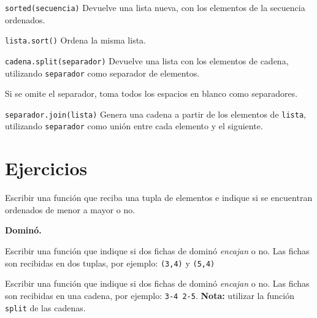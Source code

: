 \begin{referencia_python}
\begin{sintaxis}{\lstinline!sorted(secuencia)!}
Devuelve una lista nueva, con los elementos de la secuencia ordenados.
\end{sintaxis}

\begin{sintaxis}{\lstinline!lista.sort()!}
Ordena la misma lista.
\end{sintaxis}

\begin{sintaxis}{\lstinline!cadena.split(separador)!}
Devuelve una lista con los elementos de cadena, utilizando
\lstinline!separador! como separador de elementos.

Si se omite el separador, toma todos los espacios en blanco como
separadores.
\end{sintaxis}

\begin{sintaxis}{\lstinline!separador.join(lista)!}
Genera una cadena a partir de los elementos de \lstinline!lista!,
utilizando \lstinline!separador! como unión entre cada elemento y el
siguiente.
\end{sintaxis}
\end{referencia_python}


\newpage
\section{Ejercicios}

\begin{ejercicio}
Escribir una función que reciba una tupla de elementos e indique si se
encuentran ordenados de menor a mayor o no.
\end{ejercicio}


\begin{ejercicio}
{\bf Dominó.}
\begin{partes}
\item Escribir una función que indique si dos fichas de dominó {\it
encajan} o no. Las fichas son recibidas en dos tuplas, por ejemplo:
\verb!(3,4)! y \verb!(5,4)!
\item Escribir una función que indique si dos fichas de dominó {\it
encajan} o no. Las fichas son recibidas en una cadena, por ejemplo:
\verb!3-4 2-5!. {\bf Nota:} utilizar la función \verb!split! de las cadenas.
\end{partes}
\end{ejercicio}


